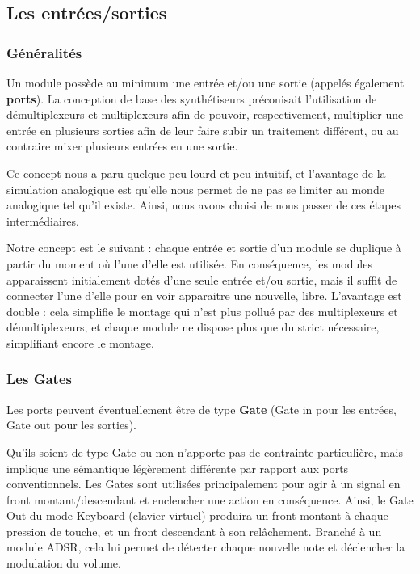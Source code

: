 \subsection{Les entrées/sorties}

\subsubsection{Généralités}

Un module possède au minimum une entrée et/ou une sortie (appelés
également \textbf{ports}). La conception de base des synthétiseurs
préconisait l'utilisation de démultiplexeurs et multiplexeurs afin
de pouvoir, respectivement, multiplier une entrée en plusieurs
sorties afin de leur faire subir un traitement différent, ou au
contraire mixer plusieurs entrées en une sortie.

Ce concept nous a paru quelque peu lourd et peu intuitif, et
l'avantage de la simulation analogique est qu'elle nous permet de
ne pas se limiter au monde analogique tel qu'il existe. Ainsi, nous
avons choisi de nous passer de ces étapes intermédiaires.

Notre concept est le suivant : chaque entrée et sortie d'un module
se duplique à partir du moment où l'une d'elle est utilisée. En
conséquence, les modules apparaissent initialement dotés d'une
seule entrée et/ou sortie, mais il suffit de connecter l'une d'elle
pour en voir apparaitre une nouvelle, libre. L'avantage est double
: cela simplifie le montage qui n'est plus pollué par des
multiplexeurs et démultiplexeurs, et chaque module ne dispose plus
que du strict nécessaire, simplifiant encore le montage.

\subsubsection{Les Gates}

Les ports peuvent éventuellement être de type \textbf{Gate} (Gate
in pour les entrées, Gate out pour les sorties).

Qu'ils soient de type Gate ou non n'apporte pas de contrainte
particulière, mais implique une sémantique légèrement différente
par rapport aux ports conventionnels. Les Gates sont utilisées
principalement pour agir à un signal en front montant/descendant et
enclencher une action en conséquence. Ainsi, le Gate Out du mode
Keyboard (clavier virtuel) produira un front montant à chaque
pression de touche, et un front descendant à son relâchement.
Branché à un module ADSR, cela lui permet de détecter chaque
nouvelle note et déclencher la modulation du volume.

